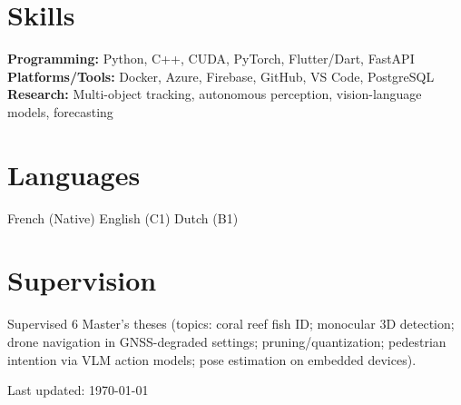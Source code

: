 \documentclass[11pt]{article}
\begin{document}
\section{Skills}
\textbf{Programming:} Python, C++, CUDA, PyTorch, Flutter/Dart, FastAPI\\
\textbf{Platforms/Tools:} Docker, Azure, Firebase, GitHub, VS Code, PostgreSQL\\
\textbf{Research:} Multi-object tracking, autonomous perception, vision-language models, forecasting

\section{Languages}
French (Native) \;\textbullet\; English (C1) \;\textbullet\; Dutch (B1)

\section{Supervision}
Supervised 6 Master’s theses (topics: coral reef fish ID; monocular 3D detection; drone navigation in GNSS-degraded settings; pruning/quantization; pedestrian intention via VLM action models; pose estimation on embedded devices).

\vspace{4pt}
{\small\textcolor{Muted}{Last updated: \today}}
\end{document}

